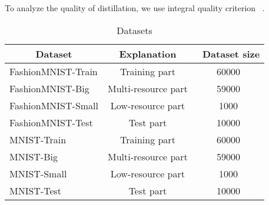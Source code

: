 \documentclass[12pt]{article}
\begin{document}
To analyze the quality of distillation, we use integral quality criterion ~\cite{Grabovoy2022}.

\begin{table}[h!t]
\begin{center}
\caption{Datasets}
\label{table_2}
\begin{tabular}{|c|c|c|}
\hline
	Dataset & Explanation &\ Dataset size\\
	\hline
	\multicolumn{1}{|l|}{FashionMNIST-Train}
	& Training part& 60000\\
	\hline
	\multicolumn{1}{|l|}{FashionMNIST-Big}
	& Multi-resource part& 59000\\
	\hline
	\multicolumn{1}{|l|}{FashionMNIST-Small}
	& Low-resource part& 1000\\
	\hline
	\multicolumn{1}{|l|}{FashionMNIST-Test}
	& Test part& 10000\\
	\hline
	\multicolumn{1}{|l|}{MNIST-Train}
	& Training part& 60000\\
	\hline
	\multicolumn{1}{|l|}{MNIST-Big}
	& Multi-resource part& 59000\\
	\hline
	\multicolumn{1}{|l|}{MNIST-Small}
	& Low-resource part& 1000\\
	\hline
	\multicolumn{1}{|l|}{MNIST-Test}
	& Test part& 10000\\
\hline

\end{tabular}
\end{center}
\end{table}





\end{document}
